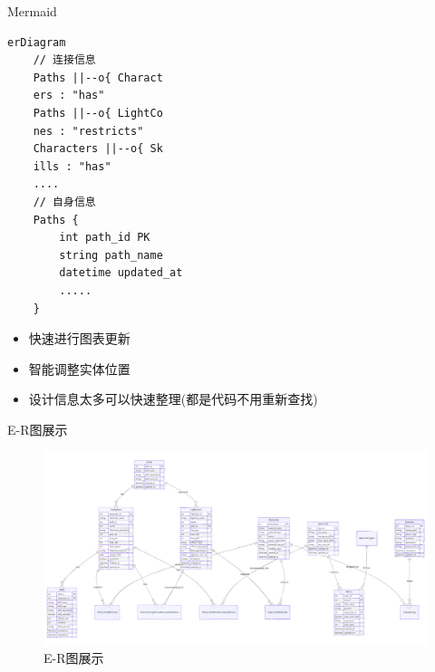 \documentclass{beamer}
\begin{document}
\begin{frame}[fragile]{Mermaid}
    \begin{minipage}{0.55\linewidth}
\begin{lstlisting}[]
erDiagram
    // 连接信息
    Paths ||--o{ Charact
    ers : "has"
    Paths ||--o{ LightCo
    nes : "restricts"
    Characters ||--o{ Sk
    ills : "has"
    ....
    // 自身信息
    Paths {
        int path_id PK
        string path_name
        datetime updated_at
        .....
    }
\end{lstlisting}
    \end{minipage}\hspace{1cm}
    \begin{minipage}{0.3\linewidth}
        \begin{itemize}
            \item 快速进行图表更新
            \item 智能调整实体位置
            \item 设计信息太多可以快速整理(都是代码不用重新查找)
            
        \end{itemize}
    \end{minipage}
    \medskip
\end{frame}


\begin{frame}{E-R图展示}
    \begin{itemize}[<+-| alert@+>] 
        \begin{figure}   
        \centering
        \includegraphics[width=1\linewidth]{img/image.png} 
        \caption{E-R图展示}
        \label{Forward and Reverse Process}
        \vspace{-0.4cm}
        \end{figure}
    \end{itemize}
\end{frame}
\end{document}
